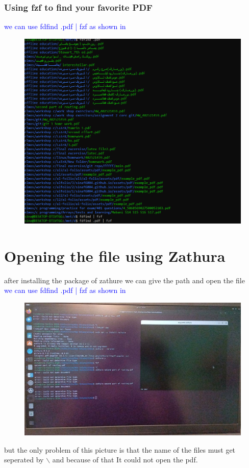 \documentclass[titlepage]{article}
\begin{document}
\subsubsection{Using fzf to find your favorite PDF}
\textcolor{blue}{we can use fdfind .pdf | fzf as shown in} 
\begin{figure}[h]
\centering
\includegraphics[width = 1.2\textwidth]{fzf2}
\end {figure}
\newpage
\section{Opening the file using Zathura}
after installing the package of zathure we can give the path and open the file\\
\textcolor{blue}{we can use fdfind .pdf | fzf as shown in} 
\begin{figure}[h]
\centering
\includegraphics[width = 1.2\textwidth]{ssss}
\end {figure}
but the only problem of this picture is that the name of the files must get seperated by $\backslash$ and because of that It could not open the pdf.
\end{document}
